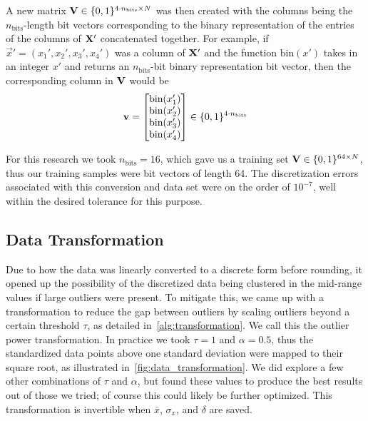 A new matrix \( \mathbf{V} \in \{0,1\}^{4\cdot n_\text{bits} \times N} \) was then created with the columns being the \( n_\text{bits} \)-length bit vectors corresponding to the binary representation of the entries of the columns of \( \mathbf{X}' \) concatenated together.
For example, if \( \vec{x}' = (x_1',x_2',x_3',x_4') \) was a column of \( \mathbf{X}' \) and the function \( \text{bin}(x') \) takes in an integer \( x' \) and returns an \( n_\text{bits} \)-bit binary representation bit vector, then the corresponding column in \( \mathbf{V} \) would be
\begin{align}
    \mathbf{v} = \begin{bmatrix}
        \text{bin}(x_1') \\
        \text{bin}(x_2') \\
        \text{bin}(x_3') \\
        \text{bin}(x_4') \\
    \end{bmatrix}
    \in \{0,1\}^{4\cdot n_\text{bits}}
\end{align}

For this research we took \( n_\text{bits} = 16 \), which gave us a training set \( \mathbf{V} \in \{0,1\}^{64 \times N} \), thus our training samples were bit vectors of length 64.
The discretization errors associated with this conversion and data set were on the order of \( 10^{-7} \), well within the desired tolerance for this purpose.

\subsection{Data Transformation}\label{sec:outlier_transform}
Due to how the data was linearly converted to a discrete form before rounding, it opened up the possibility of the discretized data being clustered in the mid-range values if large outliers were present.
To mitigate this, we came up with a transformation to reduce the gap between outliers by scaling outliers beyond a certain threshold \( \tau \), as detailed in~\cref{alg:transformation}.
We call this the outlier power transformation.
In practice we took \( \tau = 1 \) and \( \alpha = 0.5 \), thus the standardized data points above one standard deviation were mapped to their square root, as illustrated in~\cref{fig:data_transformation}.
We did explore a few other combinations of \( \tau \) and \( \alpha \), but found these values to produce the best results out of those we tried; of course this could likely be further optimized.
This transformation is invertible when \( \overline{x} \), \( \sigma_x \), and \( \delta \) are saved.

